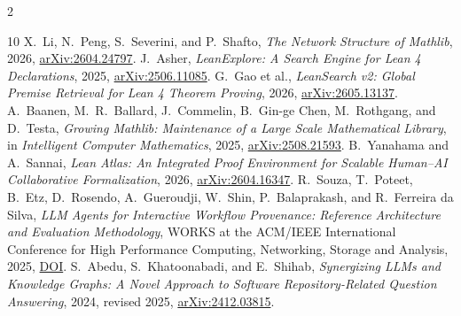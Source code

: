 \documentclass[11pt]{article}
\begin{document}
{\begin{multicols}{2}
\begin{thebibliography}{10}
 X.~Li, N.~Peng, S.~Severini, and P.~Shafto,
\emph{The Network Structure of Mathlib}, 2026,
\href{https://doi.org/10.48550/arXiv.2604.24797}{arXiv:2604.24797}.
 J.~Asher, \emph{LeanExplore: A Search Engine for Lean 4
Declarations}, 2025,
\href{https://doi.org/10.48550/arXiv.2506.11085}{arXiv:2506.11085}.
 G.~Gao et al., \emph{LeanSearch v2: Global Premise
Retrieval for Lean 4 Theorem Proving}, 2026,
\href{https://doi.org/10.48550/arXiv.2605.13137}{arXiv:2605.13137}.
 A.~Baanen, M.~R.~Ballard, J.~Commelin,
B.~Gin-ge Chen, M.~Rothgang, and D.~Testa, \emph{Growing Mathlib:
Maintenance of a Large Scale Mathematical Library}, in \emph{Intelligent
Computer Mathematics}, 2025,
\href{https://doi.org/10.48550/arXiv.2508.21593}{arXiv:2508.21593}.
 B.~Yanahama and A.~Sannai, \emph{Lean Atlas: An
Integrated Proof Environment for Scalable Human--AI Collaborative
Formalization}, 2026,
\href{https://doi.org/10.48550/arXiv.2604.16347}{arXiv:2604.16347}.
 R.~Souza, T.~Poteet, B.~Etz, D.~Rosendo,
A.~Gueroudji, W.~Shin, P.~Balaprakash, and R.~Ferreira da Silva,
\emph{LLM Agents for Interactive Workflow Provenance: Reference Architecture
and Evaluation Methodology}, WORKS at the ACM/IEEE International Conference
for High Performance Computing, Networking, Storage and Analysis, 2025,
\href{https://doi.org/10.1145/3731599.3767582}{DOI}.
 S.~Abedu, S.~Khatoonabadi, and E.~Shihab,
\emph{Synergizing LLMs and Knowledge Graphs: A Novel Approach to Software
Repository-Related Question Answering}, 2024, revised 2025,
\href{https://arxiv.org/abs/2412.03815}{arXiv:2412.03815}.
\end{thebibliography}
\end{multicols}
}
\end{document}
